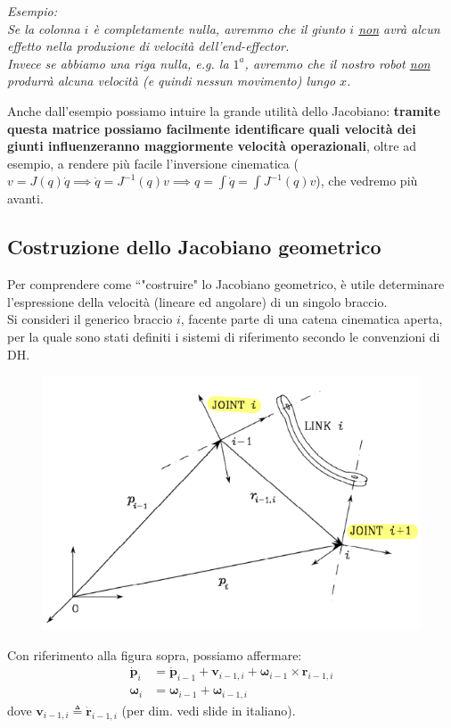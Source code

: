 \vspace*{5pt}
\textit{\small Esempio:}\\
\textit{
\small
Se la colonna $i$ è completamente nulla, avremmo che il giunto $i$ \underline{non} avrà alcun effetto nella produzione di velocità dell'end-effector.\\
Invece se abbiamo una riga nulla, e.g. la $1^a$, avremmo che il nostro robot \underline{non} produrrà alcuna velocità (e quindi nessun movimento) lungo $x$.
}

\vspace*{5pt}
Anche dall'esempio possiamo intuire la grande utilità dello Jacobiano: \textbf{tramite questa matrice possiamo facilmente identificare quali velocità dei giunti influenzeranno maggiormente velocità operazionali}, oltre ad esempio, a rendere più facile l'inversione cinematica ($v = J(q)\dot{q} \implies \dot{q} = J^{-1}(q)v \implies q = \int \dot{q} = \int J^{-1}(q)v$), che vedremo più avanti.



\subsection{Costruzione dello Jacobiano geometrico}
Per comprendere come “"costruire" lo Jacobiano geometrico, è utile determinare l’espressione della velocità (lineare ed angolare) di un singolo braccio.\\
Si consideri il generico braccio $i$, facente parte di una catena cinematica aperta, per la quale sono stati definiti i sistemi di riferimento secondo le convenzioni di DH.

\begin{figure}[H]
	\centering
	\includegraphics[width=0.5\linewidth]{images/diff_kine_2}
	\label{fig:diffkine2}
\end{figure}

Con riferimento alla figura sopra, possiamo affermare:
\begin{align*}
	\bm{\dot{p}}_i &= \bm{\dot{p}}_{i-1} + \bm{v}_{i-1, i} + \bm{\omega}_{i-1} \times \bm{r}_{i-1, i} \\
	\bm{\omega}_i &= \bm{\omega}_{i-1} + \bm{\omega}_{i-1, i}
\end{align*}
dove $\bm{v}_{i-1, i} \triangleq \bm{\dot{r}}_{i-1, i}$ (per dim. vedi slide in italiano).\\


